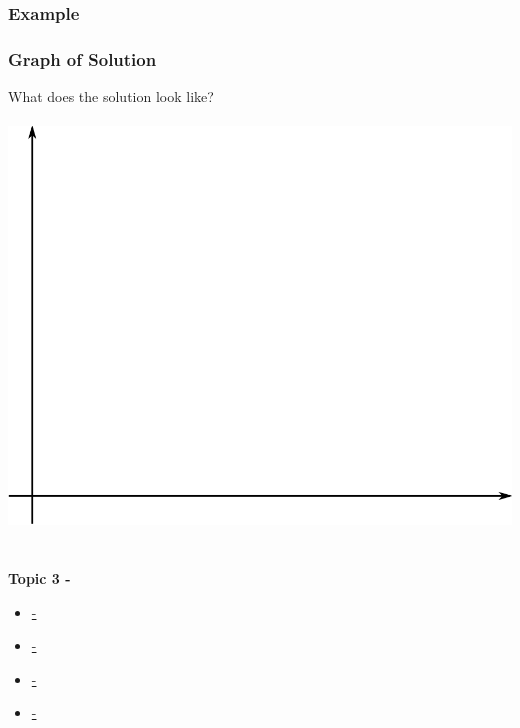 \documentclass[fleqn]{beamer} %
\newcommand{\sectionIIItitle}{}
\newcommand{\sectionIIsubsectionIIItitle}{Example}
\newcommand{\sectionIIIsubsectionItitle}{-}
\newcommand{\sectionIIIsubsectionIItitle}{-}
\newcommand{\sectionIIIsubsectionIIItitle}{-}
\newcommand{\sectionIIIsubsectionIVtitle}{-}
\begin{document}
			\begin{frame}
				\frametitle{\sectionIIsubsectionIIItitle}
				\bigskip

				\frametitle{Graph of Solution}

				What does the solution look like?\vspace{5mm}\\
				 \vspace{5mm}\\

				\includegraphics[scale=0.15]{images/lecture1_fig2.png}\hspace{5mm}%
				

				\btVFill 
			\end{frame}


		
	\section{\sectionIIItitle}\label{sectionIII}

		\begin{frame}
			\large \textbf{Topic 3 - \sectionIIItitle} \vspace{3mm}\\

			\begin{itemize}
				\item \hyperlink{sectionIIIsubsectionI}{\sectionIIIsubsectionItitle} \vspc %
				\item \hyperlink{sectionIIIsubsectionII}{\sectionIIIsubsectionIItitle} \vspc %
				\item \hyperlink{sectionIIIsubsectionIII}{\sectionIIIsubsectionIIItitle} \vspc %
				\item \hyperlink{sectionIIIsubsectionIV}{\sectionIIIsubsectionIVtitle} \vspc %
			\end{itemize}

		\end{frame}
\end{document}
